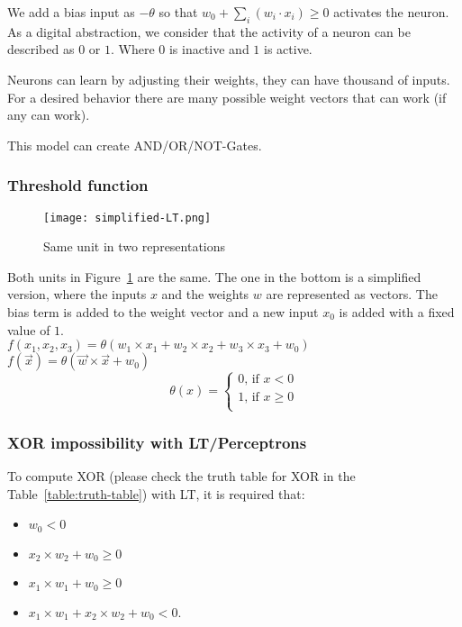 \documentclass[main]{subfiles}
\begin{document}
We add a bias input as $-\theta$ so that $w_0+\sum_i(w_i\cdot x_i)\geq0$ activates the neuron.
As a digital abstraction, we consider that the activity of a neuron can be described as $0$ or $1$. Where $0$ is inactive and $1$ is active.

Neurons can learn by adjusting their weights, they can have thousand of inputs.
For a desired behavior there are many possible weight vectors that can work (if any can work).

This model can create AND/OR/NOT-Gates.

\subsubsection{Threshold function}

\begin{figure}[H]
	\centering
	\texttt{[image: simplified-LT.png]}
	\caption{Same unit in two representations}
	\label{fig:simplified-LT}
\end{figure}

Both units in Figure~\ref{fig:simplified-LT} are the same.
The one in the bottom is a simplified version, where the inputs $x$ and the weights $w$ are represented as vectors.
The bias term is added to the weight vector and a new input $x_0$ is added with a fixed value of $1$.\\
$f(x_1, x_2, x_3) = \theta(w_1 \times x_1 + w_2 \times x_2 + w_3 \times x_3 + w_0)$\\
$f(\vec{x}) = \theta(\vec{w} \times \vec{x} + w_0)$\\

\[
  \theta(x)=
  \begin{cases}
     0 \text{, if } x < 0\\
     1 \text{, if } x \geq 0\\
  \end{cases}
\]

\subsubsection{XOR impossibility with LT/Perceptrons}
To compute XOR (please check the truth table for XOR in the Table~\ref{table:truth-table}) with LT, it is required that:

\begin{itemize}[noitemsep,nolistsep]
	\item $w_0 < 0$
	\item $x_2 \times w_2 + w_0 \geq 0$
	\item $x_1 \times w_1 + w_0 \geq 0$
	\item $x_1 \times w_1 + x_2 \times w_2 + w_0 < 0$.
\end{itemize}
\end{document}
